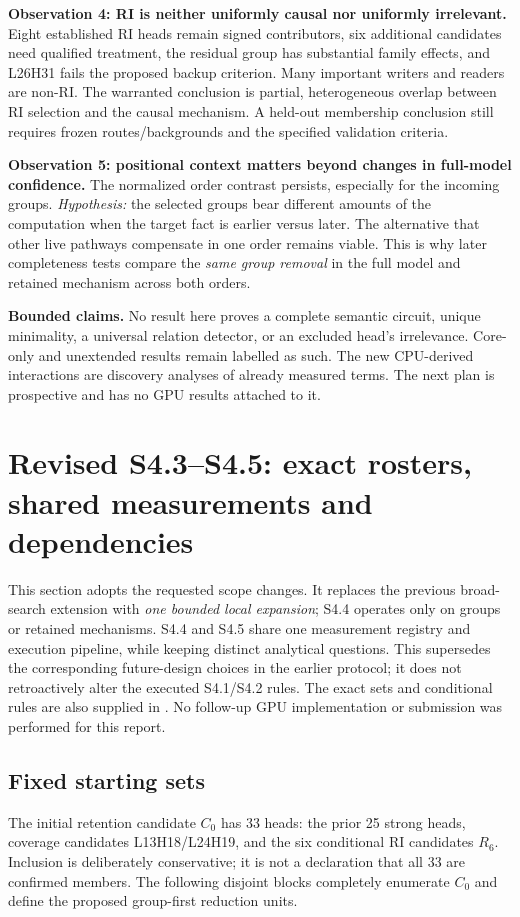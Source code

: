 \textbf{Observation 4: RI is neither uniformly causal nor uniformly irrelevant.}
Eight established RI heads remain signed contributors, six additional candidates need qualified treatment, the residual group has substantial family effects, and L26H31 fails the proposed backup criterion. Many important writers and readers are non-RI. The warranted conclusion is partial, heterogeneous overlap between RI selection and the causal mechanism. A held-out membership conclusion still requires frozen routes/backgrounds and the specified validation criteria.

\textbf{Observation 5: positional context matters beyond changes in full-model confidence.}
The normalized order contrast persists, especially for the incoming groups. \emph{Hypothesis:} the selected groups bear different amounts of the computation when the target fact is earlier versus later. The alternative that other live pathways compensate in one order remains viable. This is why later completeness tests compare the \emph{same group removal} in the full model and retained mechanism across both orders.

\textbf{Bounded claims.} No result here proves a complete semantic circuit, unique minimality, a universal relation detector, or an excluded head's irrelevance. Core-only and unextended results remain labelled as such. The new CPU-derived interactions are discovery analyses of already measured terms. The next plan is prospective and has no GPU results attached to it.

\section{Revised S4.3--S4.5: exact rosters, shared measurements and dependencies}
\label{sec:next_plan}
This section adopts the requested scope changes. It replaces the previous broad-search extension with \emph{one bounded local expansion}; S4.4 operates only on groups or retained mechanisms. S4.4 and S4.5 share one measurement registry and execution pipeline, while keeping distinct analytical questions. This supersedes the corresponding future-design choices in the earlier protocol; it does not retroactively alter the executed S4.1/S4.2 rules. The exact sets and conditional rules are also supplied in . No follow-up GPU implementation or submission was performed for this report.

\subsection{Fixed starting sets}
The initial retention candidate $C_0$ has 33 heads: the prior 25 strong heads, coverage candidates L13H18/L24H19, and the six conditional RI candidates $R_6$. Inclusion is deliberately conservative; it is not a declaration that all 33 are confirmed members. The following disjoint blocks completely enumerate $C_0$ and define the proposed group-first reduction units.

